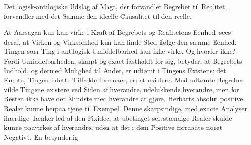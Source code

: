 \documentclass[12pt]{article}
\newcommand{\opage}[1]{\marginnote{\footnotesize\textit{[#1]}}}
\begin{document}
Det logisk-antilogiske Udslag af Magt, der forvandler Begrebet til
Realitet, forvandler med det Samme den ideelle Causalitet til den
reelle.

At Aarsagen kun kan virke i Kraft af Begrebets og Realitetens
Eenhed, sees deraf, at Virken og Virksomhed kun kan finde Sted
ifølge den samme Eenhed. Tingen som Ting i antilogisk Umiddelbarhed
kan ikke virke. Og hvorfor ikke? Fordi
\opage{45} Umiddelbarheden, skarpt og exact fastholdt for sig, betyder, at
Begrebets Indhold, og dermed Mulighed til Andet, er udtømt i
Tingens Existens; det Eneste, Tingen i dette Tilfælde formaaer, er:
at existere. Med udtømte Begreber vilde Tingene existere ved Siden
af hverandre, udelukkende hverandre, men for Resten ikke have det
Mindste med hverandre at gjøre. Herbarts absolut positive Realer
kunne herpaa tjene til Exempel. Denne skarpsindige, med exacte
Analyser ihærdige Tænker led af den Fixidee, at ubetinget
selvstændige Realer skulde kunne paavirkes af hverandre, uden at det
i dem Positive forraadte noget Negativt. En besynderlig
\end{document}
